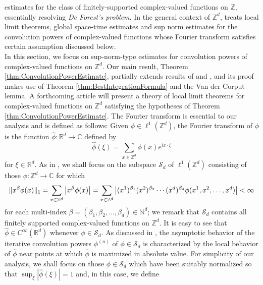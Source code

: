 \documentclass[11pt]{article}
\theoremstyle{remark}
\begin{document}
estimates for the class of finitely-supported complex-valued functions on $\mathbb{Z}$, essentially resolving \textit{De Forest's problem}. In the general context of $\mathbb{Z}^d$, \cite{randles_convolution_2017} treats local limit theorems, global space-time estimates and sup norm estimates for the convolution powers of complex-valued functions whose Fourier transform satisfies certain assumption discussed below.  \\

\noindent In this section, we focus on sup-norm-type estimates for convolution powers of complex-valued functions on $\mathbb{Z}^d$. Our main result, Theorem \ref{thm:ConvolutionPowerEstimate}, partially extends results of \cite{randles_convolution_2015} and \cite{randles_convolution_2017}, and its proof makes use of Theorem \ref{thm:BestIntegrationFormula} and the Van der Corput lemma. A forthcoming article will present a theory of local limit theorems for complex-valued functions on $\mathbb{Z}^d$ satisfying the hypotheses of Theorem \ref{thm:ConvolutionPowerEstimate}. The Fourier transform is essential to our analysis and is defined as follows: Given $\phi\in\ell^1(\mathbb{Z}^d)$, the Fourier transform of $\phi$ is the function $\widehat{\phi}:\mathbb{R}^d\to\mathbb{C}$ defined by
\begin{equation*}
    \widehat{\phi}(\xi)=\sum_{x\in\mathbb{Z}^d}\phi(x)e^{ix\cdot\xi}
\end{equation*}
for $\xi\in\mathbb{R}^d$. As in \cite{randles_convolution_2017}, we shall focus on the subspace $\mathcal{S}_d$ of $\ell^1(\mathbb{Z}^d)$ consisting of those $\phi:\mathbb{Z}^d\to\mathbb{C}$ for which
\begin{equation*}
    \|x^\beta \phi(x)\|_1=\sum_{x\in\mathbb{Z}^d}\abs{x^\beta\phi(x)}=\sum_{x\in\mathbb{Z}^d}\abs{(x^1)^{\beta_1}(x^2)^{\beta_2}\cdots(x^d)^{\beta_d}\phi(x^1,x^2,\dots,x^d)}<\infty
\end{equation*}
for each multi-index $\beta=(\beta_1,\beta_2,\dots,\beta_d)\in\mathbb{N}^d$; we remark that $\mathcal{S}_d$ contains all finitely supported complex-valued functions on $\mathbb{Z}^d$.  It is easy to see that $\widehat{\phi}\in C^\infty(\mathbb{R}^d)$ whenever $\phi\in \mathcal{S}_d$. As discussed in \cite{thomee_stability_1965,diaconis_convolution_2014,randles_convolution_2015,randles_convolution_2017}, the asymptotic behavior of the iterative convolution powers $\phi^{(n)}$ of $\phi\in\mathcal{S}_d$ is characterized by the local behavior of $\widehat{\phi}$ near points at which $\widehat{\phi}$ is maximized in absolute value. For simplicity of our analysis, we shall focus on those $\phi\in\mathcal{S}_d$ which have been suitably normalized so that $\sup_{\xi}|\widehat{\phi}(\xi)|=1$ and, in this case, we define
\end{document}
